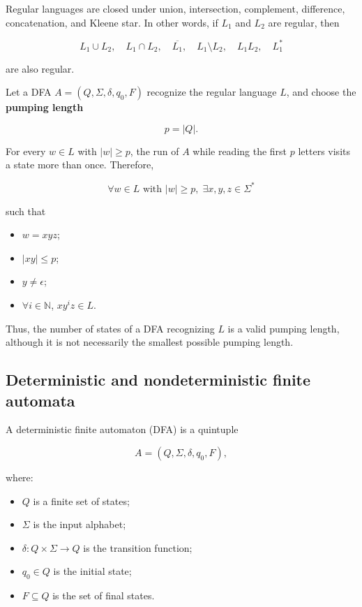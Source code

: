 \documentclass[11pt]{article}
\begin{document}
Regular languages are closed under union, intersection, complement, difference, concatenation, and Kleene star. In other words, if $L_1$ and $L_2$ are regular, then

\[
L_1\cup L_2,\quad
L_1\cap L_2,\quad
\overline{L_1},\quad
L_1\setminus L_2,\quad
L_1L_2,\quad
L_1^*
\]

are also regular.

Let a DFA $A=(Q,\Sigma,\delta,q_0,F)$ recognize the regular language $L$, and choose the \textbf{pumping length}

\[
p=|Q|.
\]

For every $w\in L$ with $|w|\geq p$, the run of $A$ while reading the first $p$ letters visits a state more than once. Therefore,

\[
\forall w\in L\text{ with }|w|\geq p,\;
\exists x,y,z\in\Sigma^*
\]

such that

\begin{itemize}
\item $w=xyz$;
\item $|xy|\leq p$;
\item $y\neq \epsilon$;
\item $\forall i\in\mathbb{N}$, $xy^iz\in L$.

\end{itemize}

Thus, the number of states of a DFA recognizing $L$ is a valid pumping length, although it is not necessarily the smallest possible pumping length.

\subsection{Deterministic and nondeterministic finite automata}


A deterministic finite automaton (DFA) is a quintuple

\[
A=(Q,\Sigma,\delta,q_0,F),
\]

where:

\begin{itemize}
\item $Q$ is a finite set of states;
\item $\Sigma$ is the input alphabet;
\item $\delta:Q\times\Sigma\rightarrow Q$ is the transition function;
\item $q_0\in Q$ is the initial state;
\item $F\subseteq Q$ is the set of final states.

\end{itemize}
\end{document}
